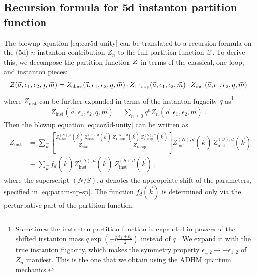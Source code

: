 \documentclass[letterpaper, 11pt]{article}
\def\CZ{{\cal Z}}
\def\e{\epsilon}
\begin{document}
\subsection{Recursion formula for 5d instanton partition function}
\label{subsec:recursion}

The blowup equation \eqref{eq:cor5d-unity} can be translated to a recursion formula on the (5d) $n$-instanton contribution $Z_n$ to the full partition function $\CZ$.
To derive this, we decompose the partition function $\CZ$ in terms of the classical, one-loop, and instanton pieces: 
\begin{align}
  \CZ(\vec{a}, \e_1, \e_2, q, \vec{m}) = Z_{\textrm{class}}(\vec{a}, \e_1, \e_2, q, \vec{m}) \cdot  Z_{\textrm{1-loop}} (\vec{a}, \e_1, \e_2, \vec{m}) \cdot Z_{\textrm{inst}}(\vec{a}, \e_1, \e_2, q, \vec{m})
 \end{align}
where $Z_\text{inst}$ can be further expanded in terms of the instanton fugacity $q$ as\footnote{Sometimes the instanton partition function is expanded in powers of the shifted instanton mass $q \exp (-b \frac{\e_1+\e_2}{2})$ instead of $q$ \cite{Nakajima:2005fg, Gottsche:2006bm, Keller:2012da}. We expand it with the true instanton fugacity, which makes the symmetry property $\e_{1, 2} \to - \e_{1, 2}$ of $Z_n$ manifest. This is the one that we obtain using the ADHM quantum mechanics.}
\begin{align}
 Z_{\textrm{inst}} (\vec{a}, \e_1, \e_2, q, \vec{m}) = \sum_{n \ge 0} q^n Z_n (\vec{a}, \e_1, \e_2, m) \ . 
\end{align}
Then the blowup equation \eqref{eq:cor5d-unity} can be written as
\begin{align}
  \label{eq:recur-inst}
  \begin{split}
 Z_{\textrm{inst}} &= \sum_{\vec{k}} \left[ \frac{Z^{(N), d}_{\textrm{class}}(\vec{k}) \, Z^{(S), d}_{\textrm{class}}(\vec{k})}{Z_{\textrm{class}}}  \frac{Z^{(N), d}_{\textrm{1-loop}}(\vec{k})\, Z^{(S), d}_{\textrm{1-loop}}(\vec{k})}{Z_{\textrm{1-loop}}} \right] Z^{(N), d}_{\textrm{inst}}(\vec{k})\, Z^{(S), d}_{\textrm{inst}}(\vec{k}) \\
  &\equiv  \sum_{\vec{k}} f_d(\vec{k}) Z^{(N), d}_{\textrm{inst}}(\vec{k})\, Z^{(S), d}_{\textrm{inst}}(\vec{k}) \ , 
  \end{split}
\end{align}
where the superscript $(N/S),d$ denotes the appropriate shift of the parameters, specified in \eqref{eq:param-np-sp}. The function $f_d(\vec{k})$ is determined only via the perturbative part of the partition function. 
\end{document}
